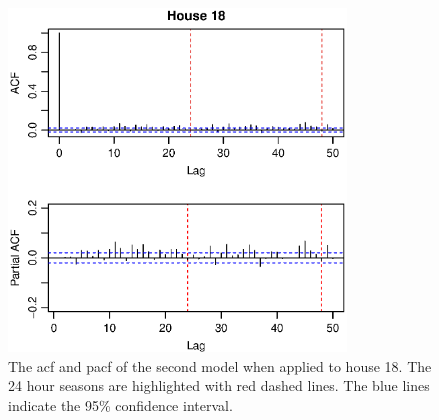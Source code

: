 \begin{figure}
    \centering
    \includegraphics[width=0.8\textwidth]{../../../figures/arimax/ACF_18_short.eps}
    \caption{The acf and pacf of the second model when applied to house 18. The 24 hour seasons are highlighted with red dashed lines. The blue lines indicate the 95\% confidence interval.}
    \label{fig:Model2_acf_18}
\end{figure}


